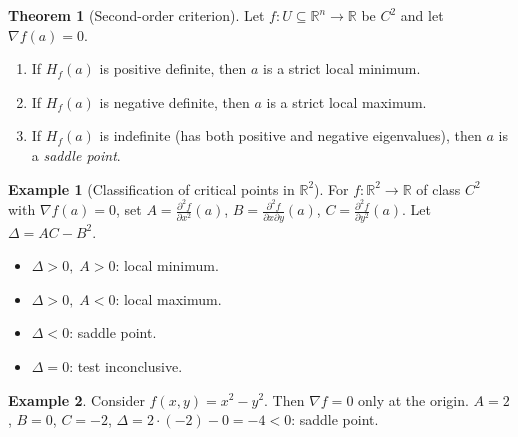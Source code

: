 \documentclass[12pt,a4paper]{book}
\theoremstyle{definition}
\newtheorem{theorem}{Theorem}[chapter]
\newtheorem{example}{Example}[chapter]
\begin{document}
\begin{theorem}[Second-order criterion]
\label{thm:second-order-criterion}
Let $f\colon U\subseteq\mathbb{R}^n\to\mathbb{R}$ be $C^2$ and let
$\nabla f(a)=0$.
\begin{enumerate}[label=(\roman*)]
  \item If $H_f(a)$ is positive definite, then $a$ is a strict local minimum.
  \item If $H_f(a)$ is negative definite, then $a$ is a strict local maximum.
  \item If $H_f(a)$ is indefinite (has both positive and negative eigenvalues),
    then $a$ is a \emph{saddle point}.
\end{enumerate}
\end{theorem}

\begin{example}[Classification of critical points in $\mathbb{R}^2$]
\label{ex:critical-points-R2}
For $f\colon\mathbb{R}^2\to\mathbb{R}$ of class $C^2$ with $\nabla f(a)=0$,
set $A=\frac{\partial^2 f}{\partial x^2}(a)$,
$B=\frac{\partial^2 f}{\partial x\partial y}(a)$,
$C=\frac{\partial^2 f}{\partial y^2}(a)$.  Let $\Delta=AC-B^2$.
\begin{itemize}
  \item $\Delta>0,\;A>0$: local minimum.
  \item $\Delta>0,\;A<0$: local maximum.
  \item $\Delta<0$: saddle point.
  \item $\Delta=0$: test inconclusive.
\end{itemize}
\end{example}

\begin{example}
Consider $f(x,y)=x^2-y^2$.  Then $\nabla f=0$ only at the origin.
$A=2$, $B=0$, $C=-2$, $\Delta=2\cdot(-2)-0=-4<0$: saddle point.
\end{example}
\end{document}
